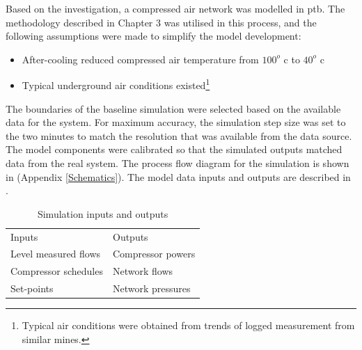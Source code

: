 Based on the investigation, a compressed air network was modelled in \gls{ptb}. The methodology described in Chapter 3 was utilised in this process, and the following assumptions were made to simplify the model development:
\begin{itemize}
	\item After-cooling reduced compressed air temperature from $ 100 ^o $ \gls{c} to $ 40 ^o $ \gls{c}
	\item Typical underground air conditions existed\footnote{Typical air conditions were obtained from trends of logged measurement from similar mines.}
\end{itemize}
 The boundaries of the baseline simulation were selected based on the available data for the system. For maximum accuracy, the simulation step size was set to the two minutes to match the resolution that was available from the data source.
The model components were calibrated so that the simulated outputs matched data from the real system. The process flow diagram for the simulation is shown in  (Appendix \ref{Schematics}). The model data inputs and outputs are described in .
\begin{table}[h!]
	\caption{Simulation inputs and outputs}
	\centering
	\begin{tabular}{ll}
		\hline 
		Inputs \hspace*{4cm} & Outputs \hspace*{4cm} \\ \hhline{==}
		Level measured flows & Compressor powers \\
		Compressor schedules & Network flows \\
		Set-points & Network pressures \\
		\hline
	\end{tabular}
		
\label{table: Mine B inputs/outputs}
\end{table}
	
